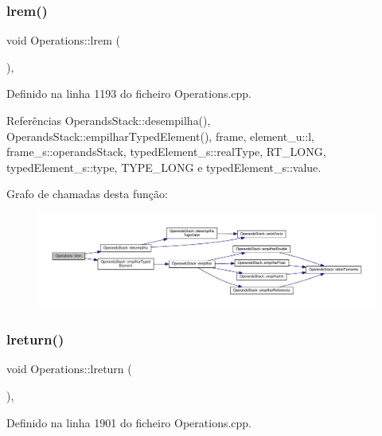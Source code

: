 \subsubsection{\texorpdfstring{lrem()}{lrem()}}
{\footnotesize\ttfamily void Operations\+::lrem (\begin{DoxyParamCaption}{ }\end{DoxyParamCaption})\hspace{0.3cm}{\ttfamily [static]}, {\ttfamily [private]}}



Definido na linha 1193 do ficheiro Operations.\+cpp.



Referências Operands\+Stack\+::desempilha(), Operands\+Stack\+::empilhar\+Typed\+Element(), frame, element\+\_\+u\+::l, frame\+\_\+s\+::operands\+Stack, typed\+Element\+\_\+s\+::real\+Type, R\+T\+\_\+\+L\+O\+NG, typed\+Element\+\_\+s\+::type, T\+Y\+P\+E\+\_\+\+L\+O\+NG e typed\+Element\+\_\+s\+::value.

Grafo de chamadas desta função\+:\nopagebreak
\begin{figure}[H]
\begin{center}
\leavevmode
\includegraphics[width=350pt]{classOperations_a437e4b34f2f1be8982d36f0cdf47f98c_cgraph}
\end{center}
\end{figure}
\mbox{\label{classOperations_adbc4db2dbfcae7185bc9b7a005e988ea}} 
\subsubsection{\texorpdfstring{lreturn()}{lreturn()}}
{\footnotesize\ttfamily void Operations\+::lreturn (\begin{DoxyParamCaption}{ }\end{DoxyParamCaption})\hspace{0.3cm}{\ttfamily [static]}, {\ttfamily [private]}}



Definido na linha 1901 do ficheiro Operations.\+cpp.



